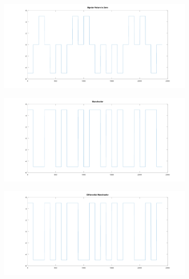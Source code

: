 \begin{enumerate}
\begin{center}
            \label{img:coding-sig-nrz}
        \end{center}
        \begin{center}
            \centering
            \includegraphics[width=0.7\textwidth]{../octave/coding/signal/bipolarrz.png}
            \label{img:coding-sig-rz}
        \end{center}
        \begin{center}
            \centering
            \includegraphics[width=0.7\textwidth]{../octave/coding/signal/manchester.png}
            \label{img:coding-sig-manchester}
        \end{center}
        \begin{center}
            \centering
            \includegraphics[width=0.7\textwidth]{../octave/coding/signal/diffmanc.png}
            \label{img:coding-sig-diffmanc}
        \end{center}


\end{enumerate}
